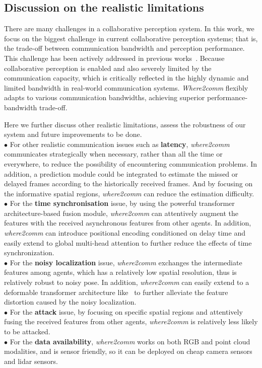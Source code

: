 \documentclass{article}
\begin{document}
\subsection{Discussion on the realistic limitations}
There are many challenges in a collaborative perception system. In this work, we focus on the biggest challenge in current collaborative perception systems; that is, the trade-off between communication bandwidth and perception performance. This challenge has been actively addressed in previous works~\cite{who2com,when2com,v2vnet,disconet}. Because collaborative perception is enabled and also severely limited by the communication capacity, which is critically reflected in the highly dynamic and limited bandwidth in real-world communication systems. \textit{Where2comm} flexibly adapts to various communication bandwidths, achieving superior performance-bandwidth trade-off.


Here we further discuss other realistic limitations, assess the robustness of our system and future improvements to be done. \\
$\bullet$ For other realistic communication issues such as \textbf{latency}, \textit{where2comm} communicates strategically when necessary, rather than all the time or everywhere, to reduce the possibility of encountering communication problems. In addition, a prediction module could be integrated to estimate the missed or delayed frames according to the historically received frames. And by focusing on the informative spatial regions, \textit{where2comm} can reduce the estimation difficulty. \\
$\bullet$ For the \textbf{time synchronisation} issue, by using the powerful transformer architecture-based fusion module, \textit{where2comm} can attentively augment the features with the received asynchronous features from other agents. In addition, \textit{where2comm} can introduce positional encoding conditioned on delay time and easily extend to global multi-head attention to further reduce the effects of time synchronization.\\
$\bullet$ For the \textbf{noisy localization} issue, \textit{where2comm} exchanges the intermediate features among agents, which has a relatively low spatial resolution, thus is relatively robust to noisy pose. In addition, \textit{where2comm} can easily extend to a deformable transformer architecture like~\cite{DeformableDETR} to further alleviate the feature distortion caused by the noisy localization.\\
$\bullet$ For the \textbf{attack} issue, by focusing on specific spatial regions and attentively fusing the received features from other agents, \textit{where2comm} is relatively less likely to be attacked. \\
$\bullet$ For the \textbf{data availability}, \textit{where2comm} works on both RGB and point cloud modalities, and is sensor friendly, so it can be deployed on cheap camera sensors and lidar sensors.
\end{document}
